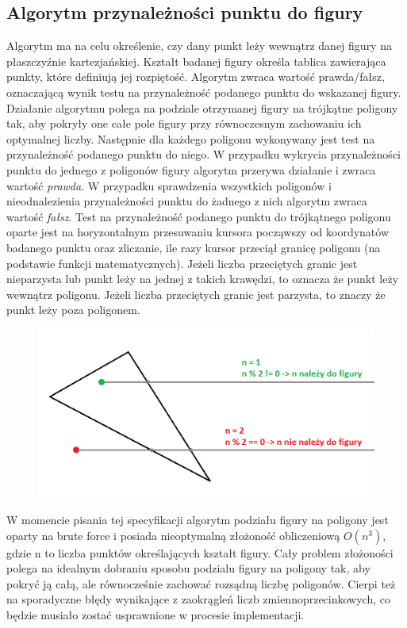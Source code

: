 \documentclass{article}
\newcommand\tab[1][1cm]{\hspace*{#1}}
\begin{document}
\subsection{Algorytm przynależności punktu do figury}
\tab Algorytm ma na celu określenie, czy dany punkt leży wewnątrz danej figury na płaszczyźnie kartezjańskiej. Kształt badanej figury określa tablica zawierająca punkty, które definiują jej rozpiętość. Algorytm zwraca wartość prawda/fałsz, oznaczającą wynik testu na przynależność podanego punktu do wskazanej figury.
\newline \tab Działanie algorytmu polega na podziale otrzymanej figury na trójkątne poligony tak, aby pokryły one całe pole figury przy równoczesnym zachowaniu ich optymalnej liczby. Następnie dla każdego poligonu wykonywany jest test na przynależność podanego punktu do niego. W przypadku wykrycia przynależności punktu do jednego z poligonów figury algorytm przerywa działanie i zwraca wartość \textit{prawda}. W przypadku sprawdzenia wszystkich poligonów i nieodnalezienia przynależności punktu do żadnego z nich algorytm zwraca wartość \textit{fałsz}.
\newline \tab Test na przynależność podanego punktu do trójkątnego poligonu oparte jest na horyzontalnym przesuwaniu kursora począwszy od koordynatów badanego punktu oraz zliczanie, ile razy kursor przeciął granicę poligonu (na podstawie funkcji matematycznych). Jeżeli liczba przeciętych granic jest nieparzysta lub punkt leży na jednej z takich krawędzi, to oznacza że punkt leży wewnątrz poligonu. Jeżeli liczba przeciętych granic jest parzysta, to znaczy że punkt leży poza poligonem.
\begin{figure}[H]
    \includegraphics[width=12cm]{MembershipTest.png}
    \centering
\end{figure}
\tab W momencie pisania tej specyfikacji algorytm podziału figury na poligony jest oparty na brute force i posiada nieoptymalną złożoność obliczeniową $O(n^3)$, gdzie n to liczba punktów określających kształt figury. Cały problem złożoności polega na idealnym dobraniu sposobu podzialu figury na poligony tak, aby pokryć ją całą, ale równocześnie zachować rozsądną liczbę poligonów. Cierpi też na sporadyczne błędy wynikające z zaokrągleń liczb zmiennoprzecinkowych, co będzie musiało zostać usprawnione w procesie implementacji.
\end{document}
